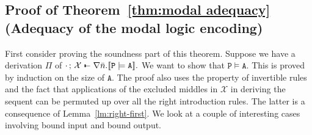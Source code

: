 \documentclass{acmtrans2m}
\newcommand \stf[2] {#1 \models #2}
\def\Xscr{{\mathcal X}}
\def\Api{{\mathtt A}}
\def\Ppi{{\mathtt P}}
\def\relbar{\mathrel{\smash-}}
\def\joinrelm{\mathrel{\mkern-3.2mu}}
\def\tailpiece{\kern 1pt\vrule height 1ex width 0.3ex depth -.25ex}
\def\seqsym{\mathrel{\tailpiece\joinrelm\relbar}}
\newcommand{\NSeq}[3]{#1\,;\,#2 \seqsym #3}
\newcommand{\trans}[1]{[\![ #1 ]\!]}
\begin{document}
\subsection{Proof of Theorem~\ref{thm:modal adequacy} (Adequacy of the
modal logic encoding)}

First consider proving the soundness part of this theorem.
Suppose we have a derivation $\Pi$ of $\NSeq{\cdot}{\Xscr}{\nabla \bar n. \trans{\stf \Ppi \Api}}.$
We want to show that $\stf \Ppi \Api$. 
This is proved by induction on the size of $\Api$. The proof also uses the property
of invertible rules and the fact that applications of the excluded middles in $\Xscr$
in deriving the sequent can be permuted up over all the right introduction rules.
The latter is a consequence of Lemma~\ref{lm:right-first}.
We look at a couple of interesting cases involving bound input and bound output.
\end{document}
